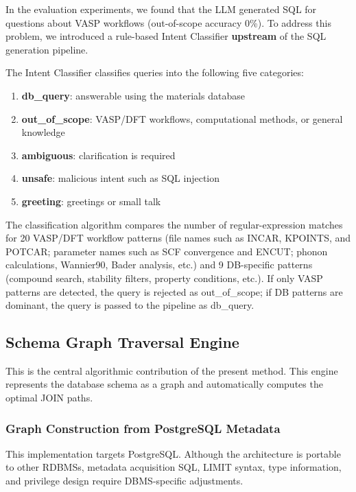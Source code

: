 \documentclass[5p,twocolumn]{elsarticle}
\begin{document}
In the evaluation experiments,
we found that the LLM generated SQL for questions about VASP workflows
(out-of-scope accuracy 0\%).
To address this problem, we introduced a rule-based Intent Classifier
\textbf{upstream} of the SQL generation pipeline.

The Intent Classifier classifies queries into the following five categories:

\begin{enumerate}
  \item \textbf{db\_query}: answerable using the materials database
  \item \textbf{out\_of\_scope}: VASP/DFT workflows, computational methods, or general knowledge
  \item \textbf{ambiguous}: clarification is required
  \item \textbf{unsafe}: malicious intent such as SQL injection
  \item \textbf{greeting}: greetings or small talk
\end{enumerate}

The classification algorithm compares the number of regular-expression matches for
20 VASP/DFT workflow patterns
(file names such as INCAR, KPOINTS, and POTCAR; parameter names such as SCF convergence and ENCUT;
phonon calculations, Wannier90, Bader analysis, etc.)
and 9 DB-specific patterns (compound search, stability filters, property conditions, etc.).
If only VASP patterns are detected, the query is rejected as out\_of\_scope;
if DB patterns are dominant, the query is passed to the pipeline as db\_query.

\subsection{Schema Graph Traversal Engine}
\label{sec:schema_graph}

This is the central algorithmic contribution of the present method.
This engine represents the database schema as a graph
and automatically computes the optimal JOIN paths.

\subsubsection{Graph Construction from PostgreSQL Metadata}

This implementation targets PostgreSQL. Although the architecture is portable to other RDBMSs,
metadata acquisition SQL, LIMIT syntax, type information, and privilege design require DBMS-specific adjustments.
\end{document}
